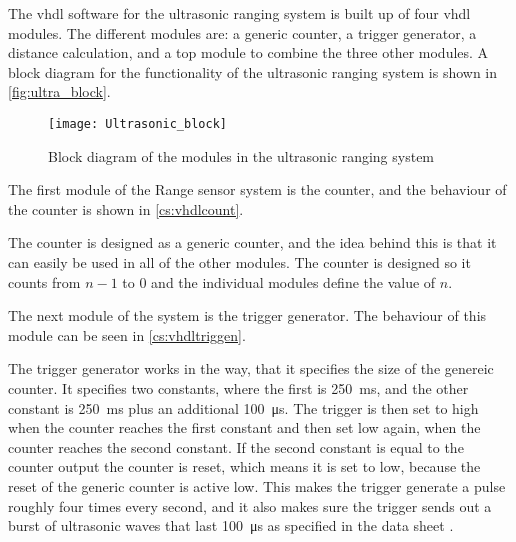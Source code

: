 The \gls{vhdl} software for the ultrasonic ranging system is built up of four \gls{vhdl} modules. The different modules are: a generic counter, a trigger generator, a distance calculation, and a top module to combine the three other modules. A block diagram for the functionality of the ultrasonic ranging system is shown in \autoref{fig:ultra_block}.

\begin{figure}[h!]%
	\centering
	\texttt{[image: Ultrasonic\_block]}
	\caption{Block diagram of the modules in the ultrasonic ranging system}
	\label{fig:ultra_block}
\end{figure}

The first module of the Range sensor system is the counter, and the behaviour of the counter is shown in \autoref{cs:vhdlcount}.


The counter is designed as a generic counter, and the idea behind this is that it can easily be used in all of the other modules. The counter is designed so it counts from $n-1$ to $0$ and the individual modules define the value of $n$.

The next module of the system is the trigger generator. The behaviour of this module can be seen in \autoref{cs:vhdltriggen}.


The trigger generator works in the way, that it specifies the size of the genereic counter. It specifies two constants, where the first is \SI{250}{\milli\second}, and the other constant is \SI{250}{\milli\second} plus an additional \SI{100}{\micro\second}. The trigger is then set to high when the counter reaches the first constant and then set low again, when the counter reaches the second constant. If the second constant is equal to the counter output the counter is reset, which means it is set to low, because the reset of the generic counter is active low. This makes the trigger generate a pulse roughly four times every second, and it also makes sure the trigger sends out a burst of ultrasonic waves that last \SI{100}{\micro\second} as specified in the data sheet \citep{HC-SR04}.



